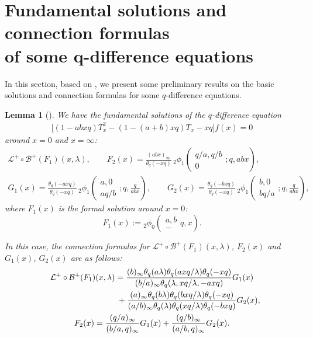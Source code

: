 \documentclass[pdftex]{sigma}
\numberwithin{equation}{section}
\newtheorem{lem}[thm]{Lemma}
\theoremstyle{definition}
\begin{document}
\section[Fundamental solutions and connection formulas of some q-difference equations]{Fundamental solutions and connection formulas\\ of some $\boldsymbol{q}$-difference equations}\label{section2}

In this section, based on \cite{O1, RSZ,Zh}, we present some preliminary results on the basic solutions and connection formulas for some $q$-difference equations.
\begin{lem}[{\cite[p.~18, Theorem~2.2.1]{Zh}}]
\label{lem:lemma1}
We have the fundamental solutions of the $q$-difference equation
\begin{gather}
\label{eq:(26)}
\big[(1-abxq)T_x^2-(1-(a+b)xq)T_x-xq\big]f(x)=0
\end{gather}
around $x=0$ and $x= \infty$:
\begin{gather*}
 \mathcal{L}^{+}\circ\mathcal{B}^{+}(F_1)(x,\lambda), \qquad F_2(x)=\frac{(abx)_\infty}{\theta_q(-xq)}\,{}_2\phi_1\left(\begin{matrix}q/a,q/b\\0 \end{matrix};q,abx\right), \\
 G_1(x)
 =
 \frac{\theta_q(-axq)}{\theta_q(-xq)}\,{}_2\phi_1\left(\begin{matrix}a,0\\ aq/b\end{matrix};q,\frac{q}{abx}\right), \qquad G_2(x)=\frac{\theta_q(-bxq)}{\theta_q(-xq)}\,{}_2\phi_1\left(\begin{matrix}b,0\\ bq/a\end{matrix};q,\frac{q}{abx}\right),
\end{gather*}
where $F_{1}(x)$ is the formal solution around $x=0$:
\[
F_1(x)
 :=
 {}_2\phi_0\left(\begin{matrix}a,b \\ -\end{matrix}q,x\right).
\]

In this case, the connection formulas for $\mathcal{L}^{+}\circ\mathcal{B}^{+}(F_1)(x,\lambda)$, $F_2(x)$ and $G_1(x)$, $G_2(x)$ are as follows:
\begin{gather*}
\mathcal{L}^{+}\circ\mathcal{B}^{+}(F_1)(x,\lambda)
 =
 \frac{(b)_\infty\theta_q(a\lambda)\theta_q(axq/\lambda)\theta_q(-xq)}{(b/a)_\infty\theta_q(\lambda,xq/\lambda,-axq)}G_1(x)\\
\hphantom{\mathcal{L}^{+}\circ\mathcal{B}^{+}(F_1)(x,\lambda)=}{}
 +\frac{(a)_\infty\theta_q(b\lambda)\theta_q(bxq/\lambda)\theta_q(-xq)}{(a/b)_\infty\theta_q(\lambda)\theta_q(xq/\lambda)\theta_q(-bxq)}G_2(x),\\
F_2(x)
 =
 \frac{(q/a)_\infty}{(b/a,q)_\infty}G_1(x)+\frac{(q/b)_\infty}{(a/b,q)_\infty}G_2(x).
\end{gather*}
\end{lem}
\end{document}
